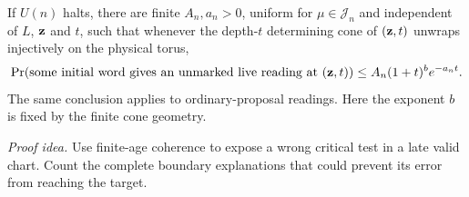 \begin{proposition}\label{c:late-live}
If \(U(n)\) halts, there are finite \(A_n,a_n>0\), uniform for
\(\mu\in \mathcal J_n\) and independent of \(L\), \({\bf z}\) and \(t\),
such that whenever the depth-\(t\) determining cone of \(({\bf z},t)\)
unwraps injectively on the physical torus,
\begin{equation}\label{eq:c-late}
 \Pr(\textup{some initial word gives an unmarked live reading at }({\bf z},t))
 \le A_n(1+t)^b e^{-a_nt}.
\end{equation}
The same conclusion applies to ordinary-proposal readings. Here the
exponent \(b\) is fixed by the finite cone geometry.
\end{proposition}
\par\noindent\emph{Proof idea.} Use finite-age coherence to expose a wrong critical test in a late valid chart. Count the complete boundary explanations that could prevent its error from reaching the target.

